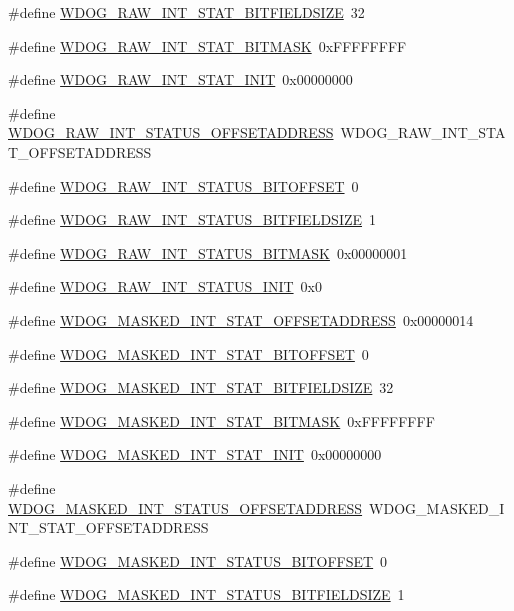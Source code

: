 \begin{DoxyCompactItemize}
\#define \hyperlink{a00577_ab3bc7ded1fa41d224673c5a9cc3afeeb}{WDOG\_\-RAW\_\-INT\_\-STAT\_\-BITFIELDSIZE}~32
\item 
\#define \hyperlink{a00577_a481dc812a5a4ca84f37bb53b048919b8}{WDOG\_\-RAW\_\-INT\_\-STAT\_\-BITMASK}~0xFFFFFFFF
\item 
\#define \hyperlink{a00577_a66f95510b1241c157b16a07497dc6ddf}{WDOG\_\-RAW\_\-INT\_\-STAT\_\-INIT}~0x00000000
\item 
\#define \hyperlink{a00577_a8fe8becf1d2134c7238921e697373a5d}{WDOG\_\-RAW\_\-INT\_\-STATUS\_\-OFFSETADDRESS}~WDOG\_\-RAW\_\-INT\_\-STAT\_\-OFFSETADDRESS
\item 
\#define \hyperlink{a00577_a72ba24ea6858c29f1f28a37e1e262de7}{WDOG\_\-RAW\_\-INT\_\-STATUS\_\-BITOFFSET}~0
\item 
\#define \hyperlink{a00577_abd3b2d158c1ff4e2e2cb6aae9969cb80}{WDOG\_\-RAW\_\-INT\_\-STATUS\_\-BITFIELDSIZE}~1
\item 
\#define \hyperlink{a00577_a42f30f04a3aba8ae01b147e64e2b0e05}{WDOG\_\-RAW\_\-INT\_\-STATUS\_\-BITMASK}~0x00000001
\item 
\#define \hyperlink{a00577_a4525de4185ad30f79c442b9147ea14a6}{WDOG\_\-RAW\_\-INT\_\-STATUS\_\-INIT}~0x0
\item 
\#define \hyperlink{a00577_ab3d4c8395aa13d8052839991d05f0467}{WDOG\_\-MASKED\_\-INT\_\-STAT\_\-OFFSETADDRESS}~0x00000014
\item 
\#define \hyperlink{a00577_ad3a6e955cb2cfc0303e4461f0e97e8a1}{WDOG\_\-MASKED\_\-INT\_\-STAT\_\-BITOFFSET}~0
\item 
\#define \hyperlink{a00577_ad05c738d0a2ea78186a0efdd7d45581a}{WDOG\_\-MASKED\_\-INT\_\-STAT\_\-BITFIELDSIZE}~32
\item 
\#define \hyperlink{a00577_af25c3a916b8594eeddec1435c31ece9c}{WDOG\_\-MASKED\_\-INT\_\-STAT\_\-BITMASK}~0xFFFFFFFF
\item 
\#define \hyperlink{a00577_ac2d3b77e107184723a662a6c4d9a9cce}{WDOG\_\-MASKED\_\-INT\_\-STAT\_\-INIT}~0x00000000
\item 
\#define \hyperlink{a00577_aa8fd78570a935a9ea0b82fd5d805fc9f}{WDOG\_\-MASKED\_\-INT\_\-STATUS\_\-OFFSETADDRESS}~WDOG\_\-MASKED\_\-INT\_\-STAT\_\-OFFSETADDRESS
\item 
\#define \hyperlink{a00577_a1c7de2ef3edebc3ad6992c708dbfae7b}{WDOG\_\-MASKED\_\-INT\_\-STATUS\_\-BITOFFSET}~0
\item 
\#define \hyperlink{a00577_aeb0d3fa99980b1853bf4bc5e82bd72e8}{WDOG\_\-MASKED\_\-INT\_\-STATUS\_\-BITFIELDSIZE}~1
\item 

\end{DoxyCompactItemize}
